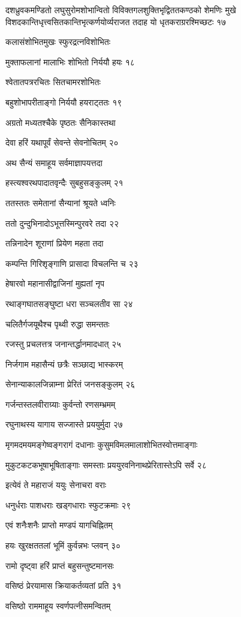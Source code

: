दशध्रुवकमण्डितो लघुसुरोमशोभान्वितो विविक्तगलशुक्तिभृद्विततकण्ठको शेमणिः मुखे
विशदकान्तिधृत्त्वसितकान्तिभृत्कर्णयोर्व्यराजत तदाह यो धृतकराग्ररश्मिच्छटः १७

कलासंशोभितमुखः स्फुरद्रत्नविशोभितः

मुक्ताफलानां मालाभिः शोभितो निर्ययौ हयः १८

श्वेतातपत्ररचितः सितचामरशोभितः

बहुशोभापरीताङ्गो निर्ययौ हयराट्ततः १९

अग्रतो मध्यतश्चैके पृष्ठतः सैनिकास्तथा

देवा हरिं यथापूर्वं सेवन्ते सेवनोचितम् २०

अथ सैन्यं समाहूय सर्वमाज्ञापयत्तदा

हस्त्यश्वरथपादातवृन्दैः सुबहुसङ्कुलम् २१

ततस्ततः समेतानां सैन्यानां श्रूयते ध्वनिः

ततो दुन्दुभिनादोऽभूत्तस्मिन्पुरवरे तदा २२

तन्निनादेन शूराणां प्रियेण महता तदा

कम्पन्ति गिरिशृङ्गाणि प्रासादा विचलन्ति च २३

हेषारवो महानासीद्वाजिनां मुह्यतां नृप

रथाङ्गघातसङ्घुष्टा धरा सञ्चलतीव सा २४

चलितैर्गजयूथैश्च पृथ्वी रुद्धा समन्ततः

रजस्तु प्रचलत्तत्र जनान्तर्द्धानमादधात् २५

निर्जगाम महासैन्यं छत्रैः सञ्छाद्य भास्करम्

सेनान्याकालजिन्नाम्ना प्रेरितं जनसङ्कुलम् २६

गर्जन्तस्तलवीराग्र्याः कुर्वन्तो रणसम्भ्रमम्

रघुनाथस्य यागाय सज्जास्ते प्रययुर्मुदा २७

मृगमदमयमङ्गेष्वङ्गरागं दधानाः कुसुमविमलमालाशोभितस्वोत्तमाङ्गाः

मुकुटकटकभूषाभूषिताङ्गाः समस्ताः प्रययुरवनिनाथप्रेरितास्तेऽपि सर्वे २८

इत्येवं ते महाराजं ययुः सेनाचरा वराः

धनुर्धराः पाशधराः खड्गधाराः स्फुटक्रमाः २९

एवं शनैःशनैः प्राप्तो मण्डपं यागचिह्नितम्

हयः खुरक्षततलां भूमिं कुर्वन्नभः प्लवन् ३०

रामो दृष्ट्वा हरिं प्राप्तं बहुसन्तुष्टमानसः

वसिष्ठं प्रेरयामास क्रियाकर्तव्यतां प्रति ३१

वसिष्ठो राममाहूय स्वर्णपत्नीसमन्वितम्

